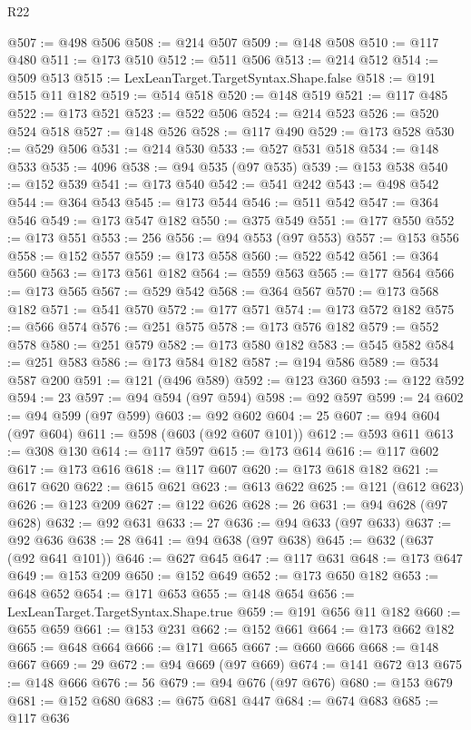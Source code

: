 \begin{lexlean}{R22}
\begin{coremodule}
@507 := @498 @506
@508 := @214 @507
@509 := @148 @508
@510 := @117 @480
@511 := @173 @510
@512 := @511 @506
@513 := @214 @512
@514 := @509 @513
@515 := LexLeanTarget.TargetSyntax.Shape.false
@518 := @191 @515 @11 @182
@519 := @514 @518
@520 := @148 @519
@521 := @117 @485
@522 := @173 @521
@523 := @522 @506
@524 := @214 @523
@526 := @520 @524 @518
@527 := @148 @526
@528 := @117 @490
@529 := @173 @528
@530 := @529 @506
@531 := @214 @530
@533 := @527 @531 @518
@534 := @148 @533
@535 := 4096
@538 := @94 @535 (@97 @535)
@539 := @153 @538
@540 := @152 @539
@541 := @173 @540
@542 := @541 @242
@543 := @498 @542
@544 := @364 @543
@545 := @173 @544
@546 := @511 @542
@547 := @364 @546
@549 := @173 @547 @182
@550 := @375 @549
@551 := @177 @550
@552 := @173 @551
@553 := 256
@556 := @94 @553 (@97 @553)
@557 := @153 @556
@558 := @152 @557
@559 := @173 @558
@560 := @522 @542
@561 := @364 @560
@563 := @173 @561 @182
@564 := @559 @563
@565 := @177 @564
@566 := @173 @565
@567 := @529 @542
@568 := @364 @567
@570 := @173 @568 @182
@571 := @541 @570
@572 := @177 @571
@574 := @173 @572 @182
@575 := @566 @574
@576 := @251 @575
@578 := @173 @576 @182
@579 := @552 @578
@580 := @251 @579
@582 := @173 @580 @182
@583 := @545 @582
@584 := @251 @583
@586 := @173 @584 @182
@587 := @194 @586
@589 := @534 @587 @200
@591 := @121 (@496 @589)
@592 := @123 @360
@593 := @122 @592
@594 := 23
@597 := @94 @594 (@97 @594)
@598 := @92 @597
@599 := 24
@602 := @94 @599 (@97 @599)
@603 := @92 @602
@604 := 25
@607 := @94 @604 (@97 @604)
@611 := @598 (@603 (@92 @607 @101))
@612 := @593 @611
@613 := @308 @130
@614 := @117 @597
@615 := @173 @614
@616 := @117 @602
@617 := @173 @616
@618 := @117 @607
@620 := @173 @618 @182
@621 := @617 @620
@622 := @615 @621
@623 := @613 @622
@625 := @121 (@612 @623)
@626 := @123 @209
@627 := @122 @626
@628 := 26
@631 := @94 @628 (@97 @628)
@632 := @92 @631
@633 := 27
@636 := @94 @633 (@97 @633)
@637 := @92 @636
@638 := 28
@641 := @94 @638 (@97 @638)
@645 := @632 (@637 (@92 @641 @101))
@646 := @627 @645
@647 := @117 @631
@648 := @173 @647
@649 := @153 @209
@650 := @152 @649
@652 := @173 @650 @182
@653 := @648 @652
@654 := @171 @653
@655 := @148 @654
@656 := LexLeanTarget.TargetSyntax.Shape.true
@659 := @191 @656 @11 @182
@660 := @655 @659
@661 := @153 @231
@662 := @152 @661
@664 := @173 @662 @182
@665 := @648 @664
@666 := @171 @665
@667 := @660 @666
@668 := @148 @667
@669 := 29
@672 := @94 @669 (@97 @669)
@674 := @141 @672 @13
@675 := @148 @666
@676 := 56
@679 := @94 @676 (@97 @676)
@680 := @153 @679
@681 := @152 @680
@683 := @675 @681 @447
@684 := @674 @683
@685 := @117 @636

\end{coremodule}
\end{lexlean}
